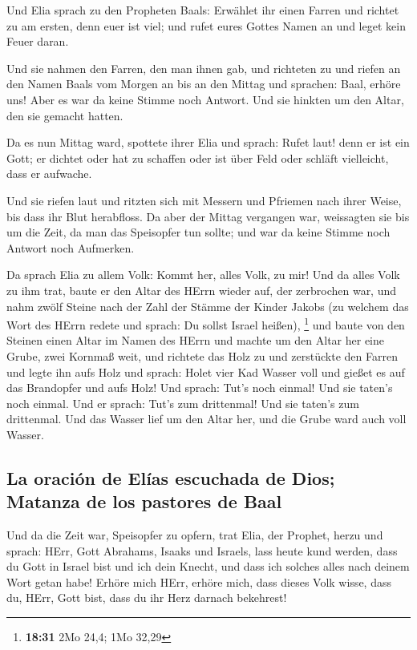  Und Elia sprach zu den Propheten Baals: Erwählet ihr
einen Farren und richtet zu am ersten, denn euer ist viel; und rufet
eures Gottes Namen an und leget kein Feuer daran.

 Und sie nahmen den Farren, den man ihnen gab, und
richteten zu und riefen an den Namen Baals vom Morgen an bis an den
Mittag und sprachen: Baal, erhöre uns! Aber es war da keine Stimme noch
Antwort. Und sie hinkten um den Altar, den sie gemacht hatten.

 Da es nun Mittag ward, spottete ihrer Elia und sprach:
Rufet laut! denn er ist ein Gott; er dichtet oder hat zu schaffen oder
ist über Feld oder schläft vielleicht, dass er aufwache.

 Und sie riefen laut und ritzten sich mit Messern und
Pfriemen nach ihrer Weise, bis dass ihr Blut herabfloss. 
Da aber der Mittag vergangen war, weissagten sie bis um die Zeit, da man
das Speisopfer tun sollte; und war da keine Stimme noch Antwort noch
Aufmerken.

 Da sprach Elia zu allem Volk: Kommt her, alles Volk, zu
mir! Und da alles Volk zu ihm trat, baute er den Altar des HErrn wieder
auf, der zerbrochen war,  und nahm zwölf Steine nach der
Zahl der Stämme der Kinder Jakobs (zu welchem das Wort des HErrn redete
und sprach: Du sollst Israel heißen), \footnote{\textbf{18:31} 2Mo 24,4;
  1Mo 32,29}  und baute von den Steinen einen Altar im
Namen des HErrn und machte um den Altar her eine Grube, zwei Kornmaß
weit,  und richtete das Holz zu und zerstückte den Farren
und legte ihn aufs Holz  und sprach: Holet vier Kad
Wasser voll und gießet es auf das Brandopfer und aufs Holz! Und sprach:
Tut's noch einmal! Und sie taten's noch einmal. Und er sprach: Tut's zum
drittenmal! Und sie taten's zum drittenmal.  Und das
Wasser lief um den Altar her, und die Grube ward auch voll Wasser.

\hypertarget{la-oraciuxf3n-de-eluxedas-escuchada-de-dios-matanza-de-los-pastores-de-baal}{%
\subsection{La oración de Elías escuchada de Dios; Matanza de los
pastores de
Baal}\label{la-oraciuxf3n-de-eluxedas-escuchada-de-dios-matanza-de-los-pastores-de-baal}}

 Und da die Zeit war, Speisopfer zu opfern, trat Elia,
der Prophet, herzu und sprach: HErr, Gott Abrahams, Isaaks und Israels,
lass heute kund werden, dass du Gott in Israel bist und ich dein Knecht,
und dass ich solches alles nach deinem Wort getan habe! 
Erhöre mich HErr, erhöre mich, dass dieses Volk wisse, dass du, HErr,
Gott bist, dass du ihr Herz darnach bekehrest!

